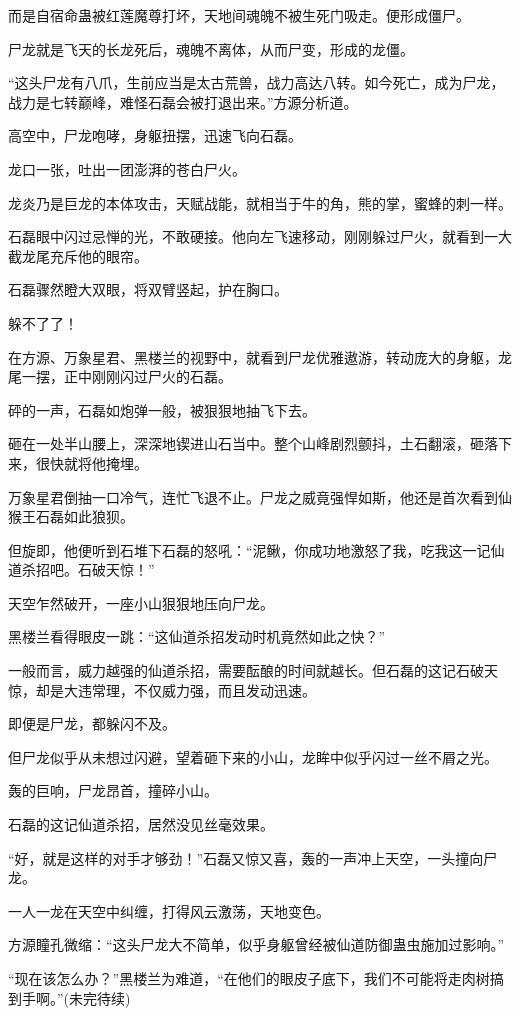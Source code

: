 \begin{this_body}
而是自宿命蛊被红莲魔尊打坏，天地间魂魄不被生死门吸走。便形成僵尸。

尸龙就是飞天的长龙死后，魂魄不离体，从而尸变，形成的龙僵。

“这头尸龙有八爪，生前应当是太古荒兽，战力高达八转。如今死亡，成为尸龙，战力是七转巅峰，难怪石磊会被打退出来。”方源分析道。

高空中，尸龙咆哮，身躯扭摆，迅速飞向石磊。

龙口一张，吐出一团澎湃的苍白尸火。

龙炎乃是巨龙的本体攻击，天赋战能，就相当于牛的角，熊的掌，蜜蜂的刺一样。

石磊眼中闪过忌惮的光，不敢硬接。他向左飞速移动，刚刚躲过尸火，就看到一大截龙尾充斥他的眼帘。

石磊骤然瞪大双眼，将双臂竖起，护在胸口。

躲不了了！

在方源、万象星君、黑楼兰的视野中，就看到尸龙优雅遨游，转动庞大的身躯，龙尾一摆，正中刚刚闪过尸火的石磊。

砰的一声，石磊如炮弹一般，被狠狠地抽飞下去。

砸在一处半山腰上，深深地锲进山石当中。整个山峰剧烈颤抖，土石翻滚，砸落下来，很快就将他掩埋。

万象星君倒抽一口冷气，连忙飞退不止。尸龙之威竟强悍如斯，他还是首次看到仙猴王石磊如此狼狈。

但旋即，他便听到石堆下石磊的怒吼：“泥鳅，你成功地激怒了我，吃我这一记仙道杀招吧。石破天惊！”

天空乍然破开，一座小山狠狠地压向尸龙。

黑楼兰看得眼皮一跳：“这仙道杀招发动时机竟然如此之快？”

一般而言，威力越强的仙道杀招，需要酝酿的时间就越长。但石磊的这记石破天惊，却是大违常理，不仅威力强，而且发动迅速。

即便是尸龙，都躲闪不及。

但尸龙似乎从未想过闪避，望着砸下来的小山，龙眸中似乎闪过一丝不屑之光。

轰的巨响，尸龙昂首，撞碎小山。

石磊的这记仙道杀招，居然没见丝毫效果。

“好，就是这样的对手才够劲！”石磊又惊又喜，轰的一声冲上天空，一头撞向尸龙。

一人一龙在天空中纠缠，打得风云激荡，天地变色。

方源瞳孔微缩：“这头尸龙大不简单，似乎身躯曾经被仙道防御蛊虫施加过影响。”

“现在该怎么办？”黑楼兰为难道，“在他们的眼皮子底下，我们不可能将走肉树搞到手啊。”(未完待续)

\end{this_body}


